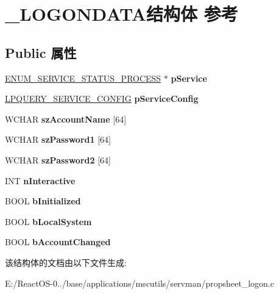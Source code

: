 \hypertarget{struct___l_o_g_o_n_d_a_t_a}{}\section{\+\_\+\+L\+O\+G\+O\+N\+D\+A\+T\+A结构体 参考}
\label{struct___l_o_g_o_n_d_a_t_a}
\subsection*{Public 属性}
\begin{DoxyCompactItemize}
\item 
\mbox{\label{struct___l_o_g_o_n_d_a_t_a_aa9a2979ffe6923fbbe7f2bdaf77552e8}} 
\hyperlink{struct___e_n_u_m___s_e_r_v_i_c_e___s_t_a_t_u_s___p_r_o_c_e_s_s_a}{E\+N\+U\+M\+\_\+\+S\+E\+R\+V\+I\+C\+E\+\_\+\+S\+T\+A\+T\+U\+S\+\_\+\+P\+R\+O\+C\+E\+SS} $\ast$ {\bfseries p\+Service}
\item 
\mbox{\label{struct___l_o_g_o_n_d_a_t_a_a01426fb6ece9c0e2f93e4bc4e92573d5}} 
\hyperlink{struct___q_u_e_r_y___s_e_r_v_i_c_e___c_o_n_f_i_g_a}{L\+P\+Q\+U\+E\+R\+Y\+\_\+\+S\+E\+R\+V\+I\+C\+E\+\_\+\+C\+O\+N\+F\+IG} {\bfseries p\+Service\+Config}
\item 
\mbox{\label{struct___l_o_g_o_n_d_a_t_a_a276244b6e610e0d22b3a6397146ffb68}} 
W\+C\+H\+AR {\bfseries sz\+Account\+Name} \mbox{[}64\mbox{]}
\item 
\mbox{\label{struct___l_o_g_o_n_d_a_t_a_a573d55138b20157f308906e42160a1ff}} 
W\+C\+H\+AR {\bfseries sz\+Password1} \mbox{[}64\mbox{]}
\item 
\mbox{\label{struct___l_o_g_o_n_d_a_t_a_aef91ed46f8e21cc9d84a5ccc196d59f8}} 
W\+C\+H\+AR {\bfseries sz\+Password2} \mbox{[}64\mbox{]}
\item 
\mbox{\label{struct___l_o_g_o_n_d_a_t_a_ac4d576d78cd6ecc69a22fad74256e3b1}} 
I\+NT {\bfseries n\+Interactive}
\item 
\mbox{\label{struct___l_o_g_o_n_d_a_t_a_a96e7a0454c4e64122c242d329d15ef4d}} 
B\+O\+OL {\bfseries b\+Initialized}
\item 
\mbox{\label{struct___l_o_g_o_n_d_a_t_a_a2ef8db50d1f9f72905320c7bc8c9c0ca}} 
B\+O\+OL {\bfseries b\+Local\+System}
\item 
\mbox{\label{struct___l_o_g_o_n_d_a_t_a_a24f00368afbdaa7497b3fe81c90a86a0}} 
B\+O\+OL {\bfseries b\+Account\+Changed}
\end{DoxyCompactItemize}


该结构体的文档由以下文件生成\+:\begin{DoxyCompactItemize}
\item 
E\+:/\+React\+O\+S-\/0../base/applications/mscutils/servman/propsheet\+\_\+logon.\+c\end{DoxyCompactItemize}
